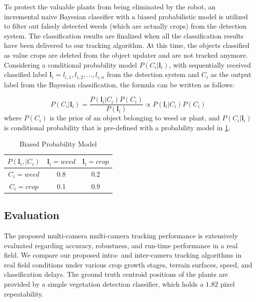 To protect the valuable plants from being eliminated by the robot, an incremental naive Bayesian classifier with a biased probabilistic model is utilized to filter out falsely detected weeds (which are actually crops) from the detection system.
The classification results are finalized when all the classification results have been delivered to our tracking algorithm. At this time, the objects classified as value crops are deleted from the object updater and are not tracked anymore.
Considering a conditional probability model $P(C_i | \mathbf{l}_i)$, with sequentially received classified label $\mathbf{l}_i = {l_{i,1},l_{i,2},\dots,l_{i,n}}$ from the detection system and $C_i$ as the output label from the Bayesian classification, the formula can be written as follows:

\begin{equation}
    P(C_i | \mathbf{l}_i) = \frac{P( \mathbf{l}_i | C_i )P(C_i)}{P(\mathbf{l}_i)} \propto P( \mathbf{l}_i | C_i )P(C_i) 
    \label{eq:agrirobotics_nbc}
\end{equation}
where $P(C_i)$ is the prior of an object belonging to weed or plant, and $P(C_i | \mathbf{l}_i)$ is conditional probability that is pre-defined with a probability model  in \ref{tbl:agrirobotics_nbc}. 

\begin{table}[t]
	\centering
  	\caption[Biased Probability Model] { Biased Probability Model  \label{tbl:agrirobotics_nbc}}
	\begin{tabular}{|c|c|c|}
\hline
$P( \mathbf{l}_i,| C_i )$ & $\mathbf{l}_i = weed$ & $\mathbf{l}_i = crop$ \\ \hline
$C_i = weed $         & 0.8               & 0.2                \\ \hline
$C_i = crop $        & 0.1               & 0.9                \\ \hline
	\end{tabular}
\end{table}

\subsection{Evaluation}

The proposed multi-camera multi-camera tracking performance is extensively evaluated regarding accuracy, robustness, and run-time performance in a real field. We compare our proposed intra- and inter-camera tracking algorithms in real field conditions under various crop growth stages, terrain surfaces, speed, and classification delays. The ground truth centroid positions of the plants are provided by a simple vegetation detection classifier, which holds a $1.82$ pixel repeatability.

